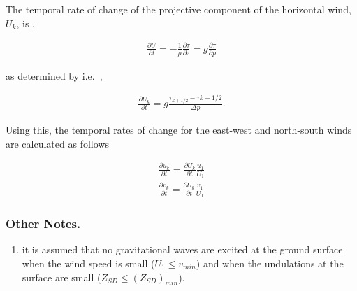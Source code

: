 The temporal rate of change of the projective component of the
horizontal wind, \(U_{k}\), is ,

\begin{eqnarray}
  \frac{\partial U}{\partial t}
        = - \frac{1}{\rho} \frac{\partial \tau}{\partial z}
        = g  \frac{\partial \tau}{\partial p}
\end{eqnarray}

as determined by i.e.~,

\begin{eqnarray}
  \frac{\partial U_{k}}{\partial t}
        =  g  \frac{\tau_{k+1/2} - \tau{k-1/2}}{\Delta p}.
\end{eqnarray}

Using this, the temporal rates of change for the east-west and
north-south winds are calculated as follows

\begin{eqnarray}
  \frac{\partial u_{k}}{\partial t}  =
           \frac{\partial U_{k}}{\partial t} \frac{u_{1}}{U_{1}} \\
  \frac{\partial v_{k}}{\partial t}  =
           \frac{\partial U_{k}}{\partial t} \frac{v_{1}}{U_{1}}
\end{eqnarray}

\hypertarget{other-notes.}{%
\subsubsection{Other Notes.}\label{other-notes.}}

\begin{enumerate}
\def\labelenumi{\arabic{enumi}.}
\tightlist
\item
  it is assumed that no gravitational waves are excited at the ground
  surface when the wind speed is small (\(U_{1} \le v_{min}\)) and when
  the undulations at the surface are small
  (\(Z_{SD} \le (Z_{SD})_{min}\)).
\end{enumerate}
